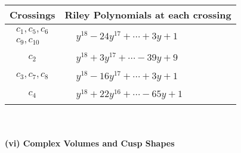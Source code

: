 \documentclass[1p]{elsarticle_modified}
\theoremstyle{definition}
\begin{document}
\begin{tabular}{m{50pt}|m{274pt}}
Crossings & \hspace{64pt}Riley Polynomials at each crossing \\
\hline $$\begin{aligned}c_{1},c_{5},c_{6}\\c_{9},c_{10}\end{aligned}$$&$\begin{aligned}
&y^{18}-24 y^{17}+\cdots+3 y+1
\end{aligned}$\\
\hline $$\begin{aligned}c_{2}\end{aligned}$$&$\begin{aligned}
&y^{18}+3 y^{17}+\cdots-39 y+9
\end{aligned}$\\
\hline $$\begin{aligned}c_{3},c_{7},c_{8}\end{aligned}$$&$\begin{aligned}
&y^{18}-16 y^{17}+\cdots+3 y+1
\end{aligned}$\\
\hline $$\begin{aligned}c_{4}\end{aligned}$$&$\begin{aligned}
&y^{18}+22 y^{16}+\cdots-65 y+1
\end{aligned}$\\
\hline
\end{tabular}\\~\\
\newpage\flushleft \textbf{(vi) Complex Volumes and Cusp Shapes}
\end{document}
